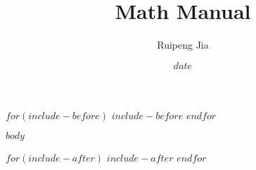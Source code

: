\documentclass{article}
\title{Math Manual}     \let\Title\@title
\author{Ruipeng Jia}    \let\Author\@author
\date{$date$}
\begin{document}
$for(include-before)$  %
$include-before$
$endfor$

$body$

$for(include-after)$
$include-after$
$endfor$
\end{document}
